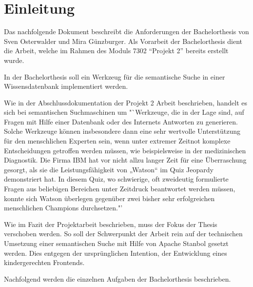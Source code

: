 \chapter{Einleitung}
\label{chap:einleitung}

Das nachfolgende Dokument beschreibt die Anforderungen der Bachelorthesis von Sven Osterwalder und Mira Günzburger. Als Vorarbeit der Bachelorthesis dient die Arbeit, welche im Rahmen des Moduls 7302 "`Projekt 2"' bereits erstellt wurde.

In der Bachelorthesis soll ein Werkzeug für die semantische Suche in einer Wissensdatenbank implementiert werden.

Wie in der Abschlussdokumentation der Projekt 2 Arbeit beschrieben, handelt es sich bei semantischen  Suchmaschinen um "`Werkzeuge, die in der Lage sind, auf Fragen mit Hilfe einer Datenbank oder des Internets Antworten zu generieren. Solche Werkzeuge können insbesondere dann eine sehr wertvolle Unterstützung für den menschlichen Experten sein, wenn unter extremer Zeitnot komplexe Entscheidungen getroffen werden müssen, wie beispielsweise in der medizinischen Diagnostik. Die Firma IBM hat vor nicht allzu langer Zeit für eine Überraschung gesorgt, als sie die Leistungsfähigkeit von „Watson“ im Quiz Jeopardy demonstriert hat. In diesem Quiz, wo schwierige, oft zweideutig formulierte Fragen aus beliebigen Bereichen unter Zeitdruck beantwortet werden müssen, konnte sich Watson überlegen gegenüber zwei bisher sehr erfolgreichen menschlichen Champions durchsetzen."'~\cite{projekt2Doc}

Wie im Fazit der Projektarbeit beschrieben, muss der Fokus der Thesis verschoben werden. So soll der Schwerpunkt der Arbeit rein auf der technischen Umsetzung einer semantischen Suche mit Hilfe von Apache Stanbol gesetzt werden. Dies entgegen der ursprünglichen Intention, der Entwicklung eines kindergerechten Frontends.

Nachfolgend werden die einzelnen Aufgaben der Bachelorthesis beschrieben.

